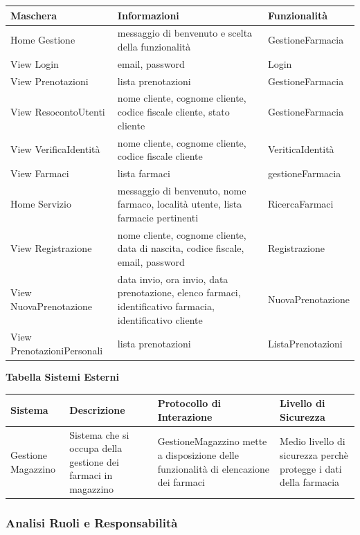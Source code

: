 \begin{tabular} {|P{3.5cm}|P{7cm}|P{5cm}|}
    \hline
    \textbf{Maschera} & \textbf{Informazioni} & \textbf{Funzionalità} \\
    \hline
    Home Gestione & messaggio di benvenuto e scelta della funzionalità & GestioneFarmacia \\
    \hline
    View Login & email, password & Login \\
    \hline
    View Prenotazioni & lista prenotazioni & GestioneFarmacia \\
    \hline
    View ResocontoUtenti & nome cliente, cognome cliente, codice fiscale cliente, stato cliente & GestioneFarmacia \\
    \hline
    View VerificaIdentità & nome cliente, cognome cliente, codice fiscale cliente  & VeriticaIdentità \\
    \hline
    View Farmaci & lista farmaci & gestioneFarmacia \\
    \hline
    Home Servizio & messaggio di benvenuto, nome farmaco, località utente, lista farmacie pertinenti & RicercaFarmaci \\
    \hline
    View Registrazione &  nome cliente, cognome cliente, data di nascita, codice fiscale, email, password  & Registrazione \\
    \hline
    View NuovaPrenotazione & data invio, ora invio, data prenotazione, elenco farmaci, identificativo farmacia, identificativo cliente & NuovaPrenotazione \\
    \hline
    View PrenotazioniPersonali & lista prenotazioni & ListaPrenotazioni \\
    \hline
\end{tabular}
\hfill \break
\hfill \break

\textbf{Tabella Sistemi Esterni}
\hfill \break

\begin{tabular} {|P{3cm}|P{4cm}|P{4cm}|P{4cm}|}
    \hline
    \textbf{Sistema} & \textbf{Descrizione} & \textbf{Protocollo di Interazione} & \textbf{Livello di Sicurezza} \\
    \hline
    Gestione Magazzino  &  Sistema che si occupa della gestione dei farmaci in magazzino  &  GestioneMagazzino mette a disposizione delle funzionalità di elencazione dei farmaci  & Medio livello di sicurezza perchè protegge i dati della farmacia  \\
    \hline
\end{tabular}
\hfill \break

\newpage
\subsubsection{Analisi Ruoli e Responsabilità}
\hfill \break

